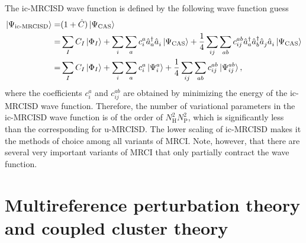 \documentclass[../Main/chem532-notes.tex]{subfiles}
\begin{document}
The ic-MRCISD wave function is defined by the following wave function guess
\begin{equation}
\begin{split}
\ket{\Psi_\text{ic-MRCISD}}  
= & (1 + \hat{C}) \ket{\Psi_\mathrm{CAS}} \\
= & \sum_I C_I \ket{\Phi_I} + \sum_{i}\sum_{a} c_{i}^{a} \hat{a}_{a}^{\dagger}\hat{a}_{i}^{\,} \ket{\Psi_\mathrm{CAS}}
+ \frac{1}{4} \sum_{ij}\sum_{ab} c_{ij}^{ab}  \hat{a}_{a}^{\dagger}\hat{a}_{b}^{\dagger}\hat{a}_{j}^{\,}\hat{a}_{i}^{\,} \ket{\Psi_\mathrm{CAS}} \\
= & \sum_I C_I \ket{\Phi_I} + \sum_{i}\sum_{a} c_{i}^{a} \ket{\Psi_{i}^{a}}
+ \frac{1}{4} \sum_{ij}\sum_{ab} c_{ij}^{ab} \ket{\Psi_{ij}^{ab}},
\end{split}
\end{equation}
where the coefficients $c_{i}^{a}$ and $c_{ij}^{ab}$ are obtained by minimizing the energy of the ic-MRCISD wave function.
Therefore, the number of variational parameters in the ic-MRCISD wave function is of the order of $N_\mathrm{H}^2 N_\mathrm{P}^2$, which is significantly less than the corresponding  for u-MRCISD.
The lower scaling of  ic-MRCISD makes it the methods of choice among all variants of MRCI.
Note, however, that there are several very important variants of MRCI that only partially contract the wave function.

\section{Multireference perturbation theory and coupled cluster theory}
\end{document}
